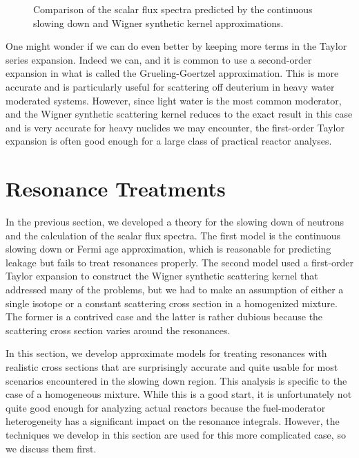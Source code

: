 \begin{figure}[tb!]
\begin{center}
\caption{Comparison of the scalar flux spectra predicted by the continuous slowing down and Wigner synthetic kernel approximations.}
 \label{Fig:thermalization_fluxSpectraComparision}
\end{center}
\end{figure}

One might wonder if we can do even better by keeping more terms in the Taylor series expansion. Indeed we can, and it is common to use a second-order expansion in what is called the Grueling-Goertzel approximation. This is more accurate and is particularly useful for scattering off deuterium in heavy water moderated systems. However, since light water is the most common moderator, and the Wigner synthetic scattering kernel reduces to the exact result in this case and is very accurate for heavy nuclides we may encounter, the first-order Taylor expansion is often good enough for a large class of practical reactor analyses.

\section{Resonance Treatments}

In the previous section, we developed a theory for the slowing down of neutrons and the calculation of the scalar flux spectra. The first model is the continuous slowing down or Fermi age approximation, which is reasonable for predicting leakage but fails to treat resonances properly. The second model used a first-order Taylor expansion to construct the Wigner synthetic scattering kernel that addressed many of the problems, but we had to make an assumption of either a single isotope or a constant scattering cross section in a homogenized mixture. The former is a contrived case and the latter is rather dubious because the scattering cross section varies around the resonances. 

In this section, we develop approximate models for treating resonances with realistic cross sections that are surprisingly accurate and quite usable for most scenarios encountered in the slowing down region. This analysis is specific to the case of a homogeneous mixture. While this is a good start, it is unfortunately not quite good enough for analyzing actual reactors because the fuel-moderator heterogeneity has a significant impact on the resonance integrals. However, the techniques we develop in this section are used for this more complicated case, so we discuss them first.

